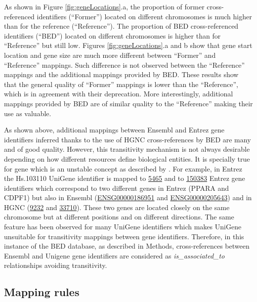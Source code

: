 \documentclass[9pt,a4paper,]{extarticle}
\theoremstyle{definition}
\theoremstyle{definition}
\theoremstyle{definition}
\theoremstyle{remark}
\begin{document}
As shown in Figure \ref{fig:geneLocations}.a,
the proportion of former cross-referenced identifiers (``Former'')
located on different
chromosomes is much higher than for the reference (``Reference'').
The proportion of BED cross-referenced identifiers (``BED'') located on different
chromosomes is higher than for ``Reference'' but still low.
Figures \ref{fig:geneLocations}.a and b show that gene start location
and gene size are much more
different between ``Former'' and ``Reference'' mappings.
Such difference is not observed between the ``Reference'' mappings and the
additional mappings provided by BED.
These results show that the general quality of ``Former'' mappings is lower
than the ``Reference'', which is in agreement with their deprecation.
More interestingly, additional mappings provided by BED
are of similar quality to the ``Reference'' making their use as valuable.

As shown above, additional mappings between Ensembl and Entrez gene identifiers
inferred thanks to the use of HGNC cross-references by BED are many and of good
quality. However, this transitivity mechanism is not always desirable
depending on how different resources define biological entities.
It is specially true for gene which is an unstable concept as described
by \citet{gerstein_what_2007}.
For example, in Entrez the Hs.103110 UniGene identifier is mapped
to \href{https://www.ncbi.nlm.nih.gov/gene/5465}{5465} and
to \href{https://www.ncbi.nlm.nih.gov/gene/150383}{150383}
Entrez gene identifiers which correspond to two different genes
in Entrez (PPARA and CDPF1) but also in
Ensembl (\href{http://www.ensembl.org/id/ENSG00000186951}{ENSG00000186951}
and \href{http://www.ensembl.org/id/ENSG00000205643}{ENSG00000205643})
and in HGNC (\href{http://www.genenames.org/cgi-bin/gene_symbol_report?hgnc_id=9232}{9232}
and \href{http://www.genenames.org/cgi-bin/gene_symbol_report?hgnc_id=33710}{33710}).
These two genes are located closely on the same chromosome but
at different positions and on different directions.
The same feature has been observed for many UniGene identifiers which makes
UniGene unsuitable for transitivity mappings between gene identifiers.
Therefore, in this instance of the BED database, as described in Methods,
cross-references between Ensembl and Unigene gene identifiers are considered
as \emph{is\_associated\_to} relationships avoiding transitivity.

\subsection{Mapping rules}\label{mapping-rules}
\end{document}
